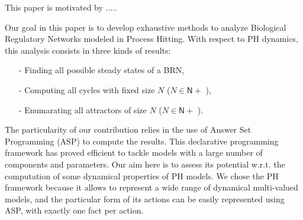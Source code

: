 This paper is motivated by ..... 

Our goal in this paper is to develop exhaustive methods to analyze Biological Regulatory Networks modeled in Process Hitting. With respect to PH dynamics, this analysis consists in three kinds of results:
\begin{itemize}
\item[-] Finding all possible steady states of a BRN,
\item[-] Computing all cycles with fixed size $N$ ($N \in \mathsf{N}+$ ),
\item[-] Enumarating all attractors of size $N$ ($N \in \mathsf{N}+$ ).
\end{itemize}
 The particularity of our contribution relies in the use of Answer Set Programming
(ASP) \cite{baral2003knowledge}
to compute the results.
This declarative programming framework has proved efficient
to tackle models with a large number of components and parameters.
Our aim here is to assess its potential w.r.t. the computation
of some dynamical properties of PH models.
We chose the PH framework because it allows to represent a wide range of dynamical multi-valued models, 
and the particular form of its actions
can be easily represented using ASP,
with exactly one fact per action.